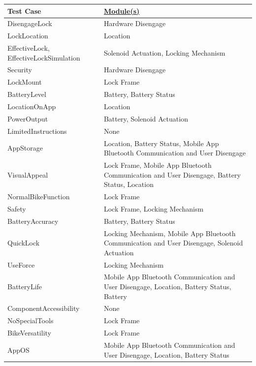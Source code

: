 \documentclass[12pt, titlepage]{article}
\begin{document}
\begin{minipage}{\textwidth}
\footnotesize
{}
\renewcommand*{\arraystretch}{1.5}
\begin{tabular}{| p{} | p{} |}
 \hline
 Test Case & \href{https://github.com/NevoAbigail/Capstone/blob/main/docs/Design/SoftArchitecture/MG.pdf}{Module(s)}  \\ 
 \hline
 DisengageLock & Hardware Disengage \\ 
  \hline
 LockLocation & Location \\ 
  \hline
 EffectiveLock, EffectiveLockSimulation & Solenoid Actuation, Locking Mechanism  \\ 
  \hline
 Security & Hardware Disengage\\ 
  \hline
 LockMount & Lock Frame \\ 
  \hline
 BatteryLevel & Battery, Battery Status \\ 
  \hline
 LocationOnApp & Location \\ 
  \hline
 PowerOutput & Battery, Solenoid Actuation \\ 
  \hline
 LimitedInstructions & None \\
 \hline
  AppStorage & Location, Battery Status, Mobile App Bluetooth Communication and User Disengage \\
 \hline
  VisualAppeal & Lock Frame,  Mobile App Bluetooth Communication and User Disengage, Battery Status, Location \\
 \hline
  NormalBikeFunction & Lock Frame \\
 \hline
  Safety & Lock Frame, Locking Mechanism \\
 \hline
  BatteryAccuracy & Battery, Battery Status \\
 \hline
  QuickLock & Locking Mechanism,  Mobile App Bluetooth Communication and User Disengage, Solenoid Actuation \\
 \hline
 UseForce & Locking Mechanism\\
 \hline
 BatteryLife &  Mobile App Bluetooth Communication and User Disengage, Location, Battery Status, Battery \\
 \hline
  ComponentAccessibility & None \\
 \hline
  NoSpecialTools & Lock Frame \\
 \hline
  BikeVersatility & Lock Frame \\
 \hline
  AppOS &  Mobile App Bluetooth Communication and User Disengage, Location, Battery Status \\
 \hline
 \end{tabular}
\end{minipage}\\
\end{document}
